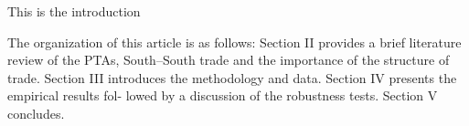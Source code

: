 This is the introduction

The organization of this article is as follows: Section II provides a
brief literature review of the PTAs, South--South trade and the
importance of the structure of trade. Section III introduces the
methodology and data. Section IV presents the empirical results fol-
lowed by a discussion of the robustness tests. Section V concludes.

